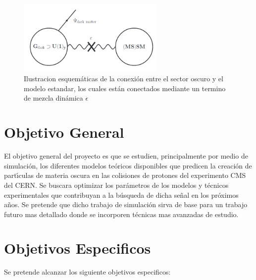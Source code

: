 \begin{figure}
\begin{center}
  \includegraphics[width=2.8in]{sketch_darksector.png}
  \caption{Ilustracion esquem\'aticas de la conexi\'on entre el sector oscuro y el modelo estandar, los cuales est\'an conectados mediante un termino de mezcla din\'amica $\epsilon$}
  \label{fig:AMS_positron}
\end{center}
\end{figure}


\chapter{Objetivo General}

El objetivo general del proyecto es que se estudien, principalmente por medio de simulaci\'on, los diferentes modelos te\'oricos disponibles que predicen la creaci\'on de part\'{\i}culas de materia oscura en las colisiones de protones del experimento CMS del CERN.  Se buscara optimizar los par\'ametros de los modelos y t\'ecnicos experimentales que contribuyan a la b\'usqueda de dicha se\~nal en los pr\'oximos a\~nos.   Se pretende que dicho trabajo de simulaci\'on sirva de base para un trabajo futuro mas detallado donde se incorporen t\'ecnicas mas avanzadas de estudio. 


\chapter{Objetivos Especificos}

Se pretende alcanzar los siguiente objetivos especificos: 

